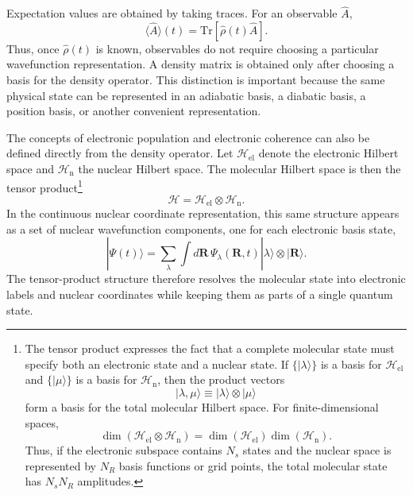 \documentclass[
  11pt,
  letterpaper,
  onehalfspacing,
  normalmargins,
  equalmargins,
  oneside
]{ut-thesis}
\begin{document}
Expectation values are obtained by taking traces. For an observable \(\hat A\),
\begin{equation}
\langle \hat A\rangle(t)
=
\mathrm{Tr}
\left[
\hat\rho(t)\hat A
\right].
\label{eq:density-operator-expectation-value}
\end{equation}
Thus, once \(\hat\rho(t)\) is known, observables do not require choosing a
particular wavefunction representation. A density matrix is obtained only after
choosing a basis for the density operator. This distinction is important
because the same physical state can be represented in an adiabatic basis, a
diabatic basis, a position basis, or another convenient representation.

The concepts of electronic population and electronic coherence can also be defined directly from the density operator. Let \(\mathcal H_{\mathrm{el}}\) denote the electronic Hilbert space and \(\mathcal H_{\mathrm n}\) the nuclear Hilbert space. The molecular Hilbert space is then the tensor product\footnote{The tensor product expresses the fact that a complete molecular state must specify both an electronic state and a nuclear state. If \(\{|\lambda\rangle\}\) is a basis for \(\mathcal H_{\mathrm{el}}\) and \(\{|\mu\rangle\}\) is a basis for \(\mathcal H_{\mathrm n}\), then the product vectors \begin{equation} |\lambda,\mu\rangle \equiv |\lambda\rangle\otimes|\mu\rangle \label{eq:tensor-product-basis} \end{equation} form a basis for the total molecular Hilbert space. For finite-dimensional spaces, \begin{equation} \dim(\mathcal H_{\mathrm{el}}\otimes\mathcal H_{\mathrm n}) = \dim(\mathcal H_{\mathrm{el}}) \dim(\mathcal H_{\mathrm n}) . \label{eq:electronic-nuclear-hilbert-space} \end{equation} Thus, if the electronic subspace contains \(N_s\) states and the nuclear space is represented by \(N_R\) basis functions or grid points, the total molecular state has \(N_sN_R\) amplitudes.} \[ \mathcal H = \mathcal H_{\mathrm{el}} \otimes \mathcal H_{\mathrm n}. \] In the continuous nuclear coordinate representation, this same structure appears as a set of nuclear wavefunction components, one for each electronic basis state, \begin{equation} |\Psi(t)\rangle = \sum_\lambda \int d\mathbf R\, \Psi_\lambda(\mathbf R,t) |\lambda\rangle\otimes|\mathbf R\rangle . \label{eq:tensor-product-coordinate-expansion} \end{equation} The tensor-product structure therefore resolves the molecular state into electronic labels and nuclear coordinates while keeping them as parts of a single quantum state.
\end{document}
